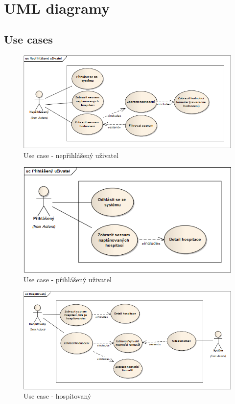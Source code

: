 \chapter{UML diagramy}
\section{Use cases}

\begin{figure}[h]
\begin{center}
\includegraphics[width=12cm]{figures/actor_base}
\caption{Use case - nepřihlášený uživatel}
\label{fig:actor_base}
\end{center}
\end{figure}

\begin{figure}[h]
\begin{center}
\includegraphics[width=12cm]{figures/actor_logged}
\caption{Use case - přihlášený uživatel}
\label{fig:actor_logged}
\end{center}
\end{figure}

\begin{figure}[h]
\begin{center}
\includegraphics[width=12cm]{figures/actor_observed}
\caption{Use case - hospitovaný}
\label{fig:actor_observed}
\end{center}
\end{figure}

